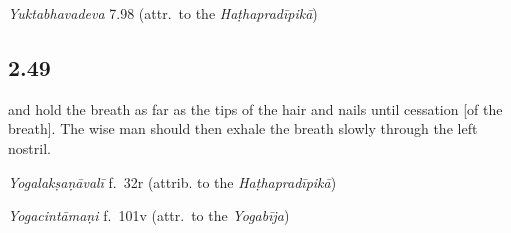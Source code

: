 \begin{ekdosis}
\begin{testimonia}[hp02_048]
\emph{Yuktabhavadeva} 7.98 (attr.~to the \emph{Haṭhapradīpikā})

\begin{versinnote}
\end{versinnote}
\end{testimonia}

\begin{philcomm}[hp02_048]
\end{philcomm}

\subsection*{2.49}
\begin{translation}[hp02_049]
and hold the breath as far as the tips of the hair and nails until cessation [of the breath]. The wise man should then exhale the breath slowly through the left nostril.
\end{translation}


\begin{testimonia}[hp02_049]
\emph{Yogalakṣaṇāvalī} f.~32r (attrib. to the \emph{Haṭhapradīpikā})
\begin{versinnote}
\end{versinnote}

\emph{Yogacintāmaṇi} f.~101v (attr.~to the \emph{Yogabīja})
\begin{versinnote} 
\end{versinnote}


\end{testimonia}
\end{ekdosis}
